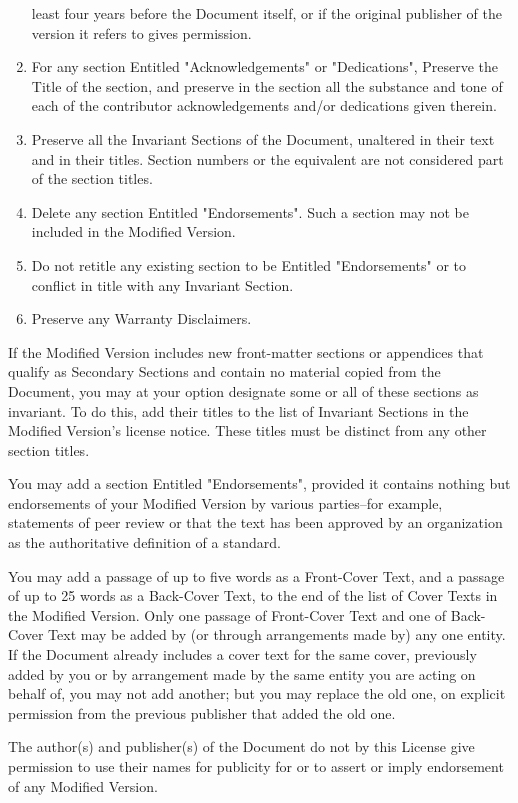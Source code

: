\documentclass[11pt]{article}
\begin{document}
\begin{enumerate}
   least four years before the Document itself, or if the original
   publisher of the version it refers to gives permission.
\item For any section Entitled "Acknowledgements" or "Dedications",
   Preserve the Title of the section, and preserve in the section all
   the substance and tone of each of the contributor acknowledgements
   and/or dedications given therein.
\item Preserve all the Invariant Sections of the Document,
   unaltered in their text and in their titles.  Section numbers
   or the equivalent are not considered part of the section titles.
\item Delete any section Entitled "Endorsements".  Such a section
   may not be included in the Modified Version.
\item Do not retitle any existing section to be Entitled "Endorsements"
   or to conflict in title with any Invariant Section.
\item Preserve any Warranty Disclaimers.
\end{enumerate}

If the Modified Version includes new front-matter sections or
appendices that qualify as Secondary Sections and contain no material
copied from the Document, you may at your option designate some or all
of these sections as invariant.  To do this, add their titles to the
list of Invariant Sections in the Modified Version's license notice.
These titles must be distinct from any other section titles.

You may add a section Entitled "Endorsements", provided it contains
nothing but endorsements of your Modified Version by various
parties--for example, statements of peer review or that the text has
been approved by an organization as the authoritative definition of a
standard.

You may add a passage of up to five words as a Front-Cover Text, and a
passage of up to 25 words as a Back-Cover Text, to the end of the list
of Cover Texts in the Modified Version.  Only one passage of
Front-Cover Text and one of Back-Cover Text may be added by (or
through arrangements made by) any one entity.  If the Document already
includes a cover text for the same cover, previously added by you or
by arrangement made by the same entity you are acting on behalf of,
you may not add another; but you may replace the old one, on explicit
permission from the previous publisher that added the old one.

The author(s) and publisher(s) of the Document do not by this License
give permission to use their names for publicity for or to assert or
imply endorsement of any Modified Version.
\end{document}
